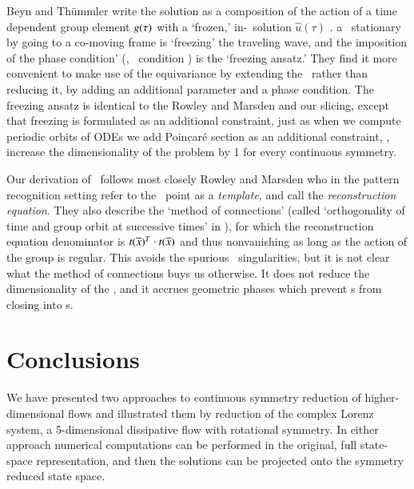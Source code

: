 \documentclass[preprint,number,sort&compress]{elsarticle}
\begin{document}
Beyn and Th\"ummler write the solution as a composition of
the action of a time dependent group element $g(\tau)$ with
a `frozen,' in-\slice\ solution $\hat{u}(\tau)$
.  a \reqv\ stationary
by going to a co-moving frame is `freezing' the
traveling wave, and the imposition of the phase
condition' (\ie, \slice\ condition ) is the
`freezing ansatz.' They find it more convenient to make use
of the equivariance by extending the \statesp\ rather than
reducing it, by adding an additional parameter and a phase
condition.
The freezing ansatz is identical
to the Rowley and Marsden and our
slicing, except that freezing is formulated as an
additional constraint, just as when we compute periodic
orbits of ODEs we add Poincar\'e section as an additional
constraint, \ie, increase the dimensionality of the problem
by 1 for every continuous symmetry.

Our derivation of \mslices\ follows most closely
Rowley and Marsden who in the
pattern recognition setting refer to the \slice\ point as a
{\em template}, and call  the {\em reconstruction
equation}. They also describe the `method
of connections' (called `orthogonality of time and group
orbit at successive times' in ), for which the
reconstruction equation  denominator is
$t(\overline{x})^T \cdot t(\overline{x})$ and thus
nonvanishing as long as the action of the group is regular.
This avoids the spurious \slice\ singularities, but it is not
clear what the method of connections buys us otherwise. It
does not reduce the dimensionality of the \statesp, and it
accrues geometric phases which prevent \rpo s from closing
into \po s.


\section{\label{sec:concl} Conclusions}

We have presented two approaches to continuous symmetry
reduction of higher-dimensional flows and illustrated them
by reduction of the complex Lorenz system, a 5-dimensional
dissipative flow with rotational symmetry.
In either approach numerical computations can be performed in
the original, full state-space representation, and then the
solutions can be projected onto the symmetry reduced state
space.
\end{document}
